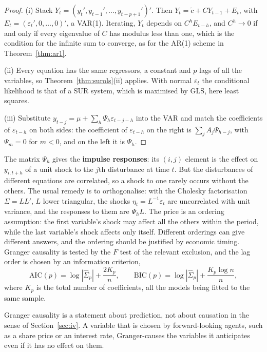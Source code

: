 \documentclass[11pt,a4paper]{article}
\numberwithin{equation}{section}
\theoremstyle{definition}
\begin{document}
\begin{proof}
(i) Stack $Y_t = (y_t', y_{t-1}', \dots, y_{t-p+1}')'$. Then $Y_t = \tilde c + CY_{t-1} + E_t$, with $E_t = (\varepsilon_t', 0, \dots, 0)'$, a VAR(1). Iterating, $Y_t$ depends on $C^hE_{t-h}$, and
$C^h \to 0$ if and only if every eigenvalue of $C$ has modulus less than one, which is the condition for the infinite sum to converge, as for the AR(1)
scheme in Theorem~\ref{thm:ar1}.

(ii) Every equation has the same regressors, a constant and $p$ lags of all the variables, so Theorem~\ref{thm:surols}(ii) applies. With normal $\varepsilon_t$ the
conditional likelihood is that of a SUR system, which is maximised by GLS, here least squares.

(iii) Substitute $y_{t-j} = \mu + \sum_h\Psi_h\varepsilon_{t-j-h}$ into the VAR and match the coefficients of $\varepsilon_{t-h}$ on both sides: the coefficient of $\varepsilon_{t-h}$ on the right is
$\sum_jA_j\Psi_{h-j}$, with $\Psi_m = 0$ for $m < 0$, and on the left it is $\Psi_h$.
\end{proof}

The matrix $\Psi_h$ gives the \textbf{impulse responses}: its $(i, j)$ element is the effect on $y_{i,t+h}$ of a unit shock to the $j$th disturbance at time $t$. But the
disturbances of different equations are correlated, so a shock to one rarely occurs without the others. The usual remedy is to orthogonalise: with the
Cholesky factorisation $\Sigma = LL'$, $L$ lower triangular, the shocks $\eta_t = L^{-1}\varepsilon_t$ are uncorrelated with unit variance, and the responses to them are $\Psi_hL$. The
price is an ordering assumption: the first variable's shock may affect all the others within the period, while the last variable's shock affects only
itself. Different orderings can give different answers, and the ordering should be justified by economic timing. Granger causality is tested by the $F$
test of the relevant exclusion, and the lag order is chosen by an information criterion,
\[
\text{AIC}(p) = \log|\hat\Sigma_p| + \frac{2K_p}{n}, \qquad \text{BIC}(p) = \log|\hat\Sigma_p| + \frac{K_p\log n}{n},
\]
where $K_p$ is the total number of coefficients, all the models being fitted to the same sample.

Granger causality is a statement about prediction, not about causation in the sense of Section~\ref{sec:iv}. A variable that is chosen by forward-looking
agents, such as a share price or an interest rate, Granger-causes the variables it anticipates even if it has no effect on them.
\end{document}
